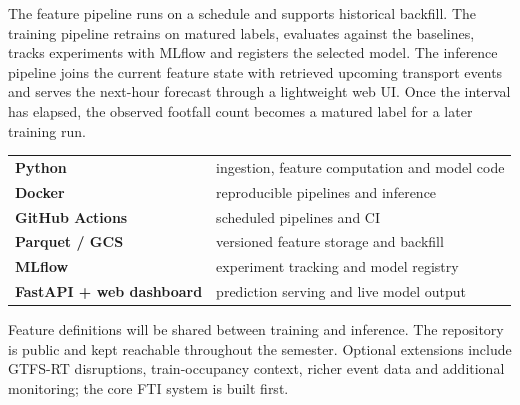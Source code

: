\documentclass[10pt,a4paper]{article}
\begin{document}
The feature pipeline runs on a schedule and supports historical backfill. The training pipeline retrains on matured labels, evaluates against the baselines, tracks experiments with MLflow and registers the selected model. The inference pipeline joins the current feature state with retrieved upcoming transport events and serves the next-hour forecast through a lightweight web UI. Once the interval has elapsed, the observed footfall count becomes a matured label for a later training run.

\begin{center}
\scriptsize
\begin{tabular}{@{}>{\bfseries}p{27mm}p{91mm}@{}}
\toprule
Python & ingestion, feature computation and model code \\
Docker & reproducible pipelines and inference \\
GitHub Actions & scheduled pipelines and CI \\
Parquet / GCS & versioned feature storage and backfill \\
MLflow & experiment tracking and model registry \\
FastAPI + web dashboard & prediction serving and live model output \\
\bottomrule
\end{tabular}
\end{center}

Feature definitions will be shared between training and inference. The repository is public and kept reachable throughout the semester. Optional extensions include GTFS-RT disruptions, train-occupancy context, richer event data and additional monitoring; the core FTI system is built first.
\end{document}
